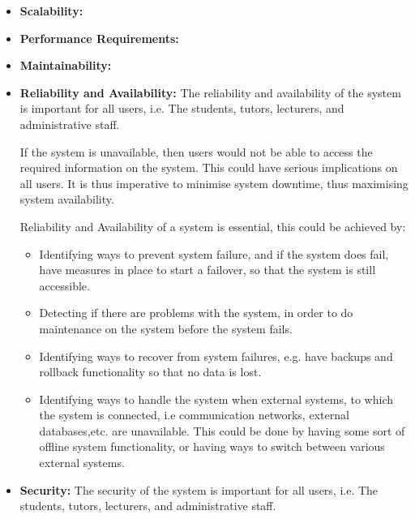 
\begin{flushleft}
	\begin{itemize}
		\item \textbf{Scalability:} 
		\item \textbf{Performance Requirements:} 
		\item \textbf{Maintainability:} 
	
		\item \textbf{Reliability and Availability:} 
The reliability and availability of the system is important for all users, i.e. The students, tutors, lecturers, and administrative staff.
\newline

If the system is unavailable, then users would not be able to access the required information on the system. This could have serious implications on all users. It is thus imperative to minimise system downtime, thus maximising system availability.\newline

Reliability and Availability of a system is essential, this could be achieved by:
\begin{itemize}
\item Identifying ways to prevent system failure, and if the system does fail, have measures in place to start a failover, so that the system is still accessible.
\item Detecting if there are problems with the system, in order to do maintenance on the system before the system fails.
\item Identifying ways to recover from system failures, e.g. have backups and rollback functionality so that no data is lost.
\item Identifying ways to handle the system when external systems, to which the system is connected, i.e communication networks, external databases,etc. are unavailable. This could be done by having some sort of offline system functionality, or having ways to switch between various external systems.
\end{itemize}

	
		
		\item \textbf{Security:} 
The security of the system is important for all users, i.e. The students, tutors, lecturers, and administrative staff.
\newline


\end{itemize}
\end{flushleft}
